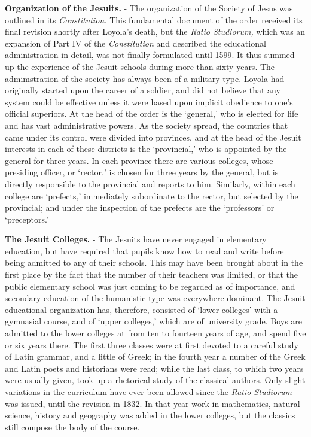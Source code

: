 \documentclass[]{book}
\begin{document}
\textbf{Organization of the Jesuits.} - The organization of the Society of Jesus was outlined in its \emph{Constitution.} This fundamental document of the order received its final revision shortly after Loyola's death, but the \emph{Ratio Studiorum,} which was an expansion of Part IV of the \emph{Constitution} and described the educational administration in detail, was not finally formulated until 1599. It thus summed up the experience of the Jesuit schools during more than sixty years. The admimstration of the society has always been of a military type. Loyola had originally started upon the career of a soldier, and did not believe that any system could be effective unless it were based upon implicit obedience to one's official superiors. At the head of the order is the `general,' who is elected for life and has vast administrative powers. As the society spread, the countries that came under its control were divided into provinces, and at the head of the Jesuit interests in each of these districts is the `provincial,' who is appointed by the general for three years. In each province there are various colleges, whose presiding officer, or `rector,' is chosen for three years by the general, but is directly responsible to the provincial and reports to him. Similarly, within each college are `prefects,' immediately subordinate to the rector, but selected by the provincial; and under the inspection of the prefects are the `professors' or `preceptors.'

\textbf{The Jesuit Colleges.} - The Jesuits have never engaged in elementary education, but have required that pupils know how to read and write before being admitted to any of their schools. This may have been brought about in the first place by the fact that the number of their teachers was limited, or that the public elementary school was just coming to be regarded as of importance, and secondary education of the humanistic type was everywhere dominant. The Jesuit educational organization has, therefore, consisted of `lower colleges' with a gymnasial course, and of `upper colleges,' which are of university grade. Boys are admitted to the lower colleges at from ten to fourteen years of age, and spend five or six years there. The first three classes were at first devoted to a careful study of Latin grammar, and a little of Greek; in the fourth year a number of the Greek and Latin poets and historians were read; while the last class, to which two years were usually given, took up a rhetorical study of the classical authors. Only slight variations in the curriculum have ever been allowed since the \emph{Ratio Studiorum} was issued, until the revision in 1832. In that year work in mathematics, natural science, history and geography was added in the lower colleges, but the classics still compose the body of the course.
\end{document}
